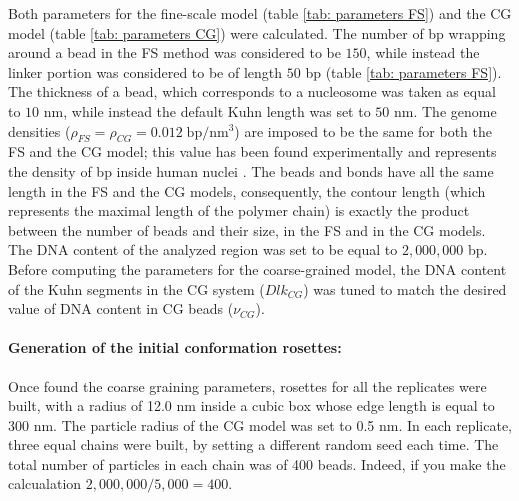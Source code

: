 Both parameters for the fine-scale model (table \ref{tab: parameters FS}) and the CG model (table \ref{tab: parameters CG}) were calculated. The number of bp wrapping around a bead in the FS method was considered to be $150$, while instead the linker portion was considered to be of length $50$ bp (table \ref{tab: parameters FS}). The thickness of a bead, which corresponds to a nucleosome was taken as equal to $10$ nm, while instead the default Kuhn length was set to $50$ nm. The genome densities ($\rho_{FS} = \rho_{CG} = 0.012\; \text{bp}/\text{nm}^3$) are imposed to be the same for both the FS and the CG model; this value has been found experimentally and represents the density of bp inside human nuclei
\cite{golkaramRoleChromatinDensity2017}.
The beads and bonds have all the same length in the FS and the CG models, consequently, the contour length (which represents the maximal length of the polymer chain) is exactly the product between the number of beads and their size, in the FS and in the CG models. The DNA content of the analyzed region was set to be equal to $2,000,000$ bp. Before computing the parameters for the coarse-grained model, the DNA content of the Kuhn segments in the CG system ($Dlk_{CG}$) was tuned to match the desired value of DNA content in CG beads ($\nu_{CG}$).


\paragraph{Generation of the initial conformation rosettes:}

Once found the coarse graining parameters, rosettes for all the replicates were built, with a radius of 12.0 nm inside a cubic box whose edge length is equal to 300 nm. The particle radius of the CG model was set to 0.5 nm. In each replicate, three equal chains were built, by setting a different random seed each time. The total number of particles in each chain was of 400 beads. Indeed, if you make the calcualation $2,000,000/5,000 = 400$.



